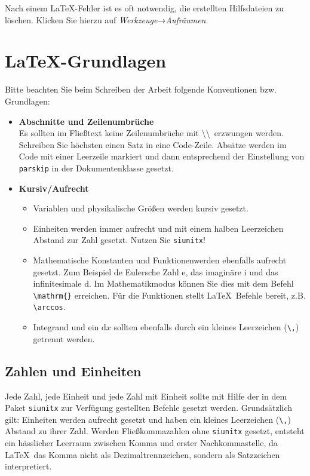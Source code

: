 Nach einem \LaTeX-Fehler ist es oft notwendig, die erstellten Hilfsdateien zu löschen.
Klicken Sie hierzu auf \emph{Werkzeuge}→\emph{Aufräumen}.


\chapter{\LaTeX-Grundlagen}

Bitte beachten Sie beim Schreiben der Arbeit folgende Konventionen bzw. Grundlagen:

\begin{itemize}
    \item \textbf{Abschnitte und Zeilenumbrüche} \\
        Es sollten im Fließtext keine Zeilenumbrüche mit \textbackslash\textbackslash \ erzwungen werden.
        Schreiben Sie höchsten einen Satz in eine Code-Zeile.
        Absätze werden im Code mit einer Leerzeile markiert und dann entsprechend der Einstellung von \texttt{parskip} in der Dokumentenklasse gesetzt.
    \item \textbf{Kursiv/Aufrecht} \\
        \begin{itemize}
            \item Variablen und physikalische Größen werden kursiv gesetzt. 
            \item Einheiten werden immer aufrecht und mit einem halben Leerzeichen Abstand zur Zahl gesetzt. Nutzen Sie \texttt{siunitx}!
            \item Mathematische Konstanten und Funktionenwerden ebenfalls aufrecht gesetzt. Zum Beispiel de Eulersche Zahl e, das imaginäre i und das infinitesimale d.
                Im Mathematikmodus können Sie dies mit dem Befehl \verb_\mathrm{}_ erreichen. Für die Funktionen stellt \LaTeX \ Befehle bereit, z.B. \verb+\arccos+.
            \item Integrand und ein $\mathrm{d}x$ sollten ebenfalls durch ein kleines Leerzeichen (\verb+\,+) getrennt werden.
        \end{itemize}
        


\end{itemize}

\section{Zahlen und Einheiten}

Jede Zahl, jede Einheit und jede Zahl mit Einheit sollte mit Hilfe der in dem Paket \texttt{siunitx} zur Verfügung gestellten Befehle gesetzt werden.
Grundsätzlich gilt: Einheiten werden aufrecht gesetzt und haben ein kleines Leerzeichen (\verb+\,+) Abstand zu ihrer Zahl. 
Werden Fließkommazahlen ohne \texttt{siunitx} gesetzt, entsteht ein hässlicher Leerraum zwischen Komma und erster Nachkommastelle, da \LaTeX \ das Komma nicht als Dezimaltrennzeichen, sondern als Satzzeichen interpretiert.

